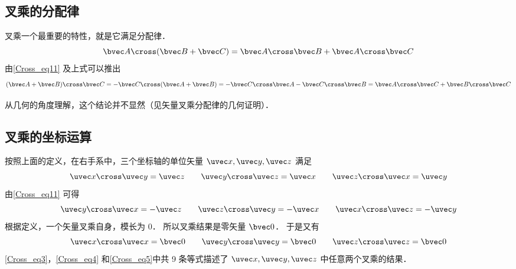 \subsection{叉乘的分配律}

叉乘一个最重要的特性，就是它满足分配律．
\begin{equation}\label{Cross_eq6}
\bvec A \cross (\bvec B +\bvec C) = \bvec A \cross \bvec B + \bvec A \cross \bvec C
\end{equation}
由\autoref{Cross_eq11} 及上式可以推出
\begin{equation}\label{Cross_eq7}
(\bvec A + \bvec B) \cross \bvec C =  - \bvec C \cross (\bvec A + \bvec B) =  - \bvec C \cross \bvec A - \bvec C \cross \bvec B = \bvec A \cross \bvec C + \bvec B \cross \bvec C
\end{equation}

从几何的角度理解，这个结论并不显然（见矢量叉乘分配律的几何证明）．

\subsection{叉乘的坐标运算}

按照上面的定义，在右手系中，三个坐标轴的单位矢量 $\uvec x, \uvec y, \uvec z$ 满足
\begin{equation}\label{Cross_eq3}
\uvec x \cross \uvec y = \uvec z
\qquad
\uvec y \cross \uvec z = \uvec x
\qquad
\uvec z \cross \uvec x = \uvec y
\end{equation}
由\autoref{Cross_eq11} 可得
\begin{equation}\label{Cross_eq4}
\uvec y \cross \uvec x =  - \uvec z
\qquad
\uvec z \cross \uvec y =  - \uvec x
\qquad
\uvec x \cross \uvec z =  - \uvec y
\end{equation}
根据定义，一个矢量叉乘自身，模长为 $0$． 所以叉乘结果是零矢量 $\bvec 0$． 于是又有
\begin{equation}\label{Cross_eq5}
\uvec x \cross \uvec x = \bvec 0
\qquad
\uvec y \cross \uvec y = \bvec 0
\qquad
\uvec z \cross \uvec z = \bvec 0
\end{equation}
\autoref{Cross_eq3}，\autoref{Cross_eq4} 和\autoref{Cross_eq5}中共 9 条等式描述了 $\uvec x, \uvec y, \uvec z$ 中任意两个叉乘的结果．



